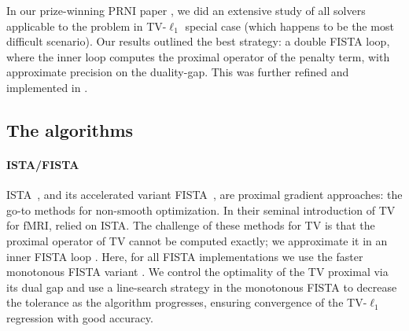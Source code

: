In our prize-winning PRNI paper  \citep{dohmatob2014benchmarking}, we did an extensive study of all solvers applicable to the problem in TV-$\ell_1$ special case (which happens to be the most difficult scenario).
Our results outlined the best strategy: a double FISTA loop, where the
inner loop computes the proximal operator of the penalty term, with approximate precision on the duality-gap. This was further refined and implemented in  \citep{varoquaux2015faasta}.


\subsection{The algorithms}
\paragraph{ISTA/FISTA}
ISTA~\citep{daubechies2004}, and its accelerated variant
FISTA~\citep{beck2009a}, are proximal gradient approaches: the go-to
methods for non-smooth optimization. In their seminal introduction of TV
for fMRI, \citep{michel2011} relied on ISTA.
The challenge of these methods for TV is that the proximal operator
  of TV
cannot be computed exactly; we approximate it in an inner FISTA loop
\citep{beck2009b,michel2011}.
Here, for all FISTA implementations we use
the faster monotonous FISTA variant \citep{beck2009b}. We control the
optimality of the TV proximal via its dual gap \citep{michel2011} and
use a line-search strategy in the monotonous FISTA to decrease the
tolerance as the algorithm progresses, ensuring convergence of the
TV-$\ell_1$ regression with good accuracy.


